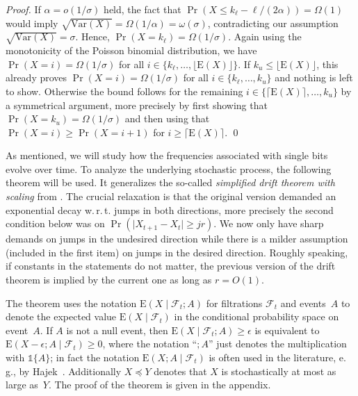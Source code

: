 \documentclass[11pt, a4paper]{article}
\DeclareMathOperator{\Prob}{Pr}
\newcommand*{\E}{\mathrm{E}}
\newcommand*{\Var}{\mathrm{Var}}
\newcommand{\wrt}{w.\,r.\,t.\xspace}
\newcommand{\eg}{e.\,g.\xspace}
\newcommand{\indic}[1]{\mathds{1}\{#1\}}
\newcommand{\filtt}{\mathcal{F}_t}
\begin{document}
\begin{proof}
If $\alpha=o(1/\sigma)$ held, the fact that $\Prob(X\le k_\ell-\ell/(2\alpha))=\Omega(1)$ 
would imply $\sqrt{\Var(X)}=\Omega(1/\alpha)=\omega(\sigma)$, 
contradicting our assumption $\sqrt{\Var(X)}=\sigma$. Hence, 
$\Prob(X=k_\ell)=\Omega(1/\sigma)$. Again using the monotonicity of 
the Poisson binomial distribution, we have
$\Prob(X=i)=\Omega(1/\sigma)$ for all $i\in\{k_\ell,\dots,\lfloor\E(X)\rfloor\}$. 
If $k_u\le \lfloor\E(X)\rfloor$, this already proves 
$\Prob(X=i)=\Omega(1/\sigma)$ for all $i\in\{k_\ell,\dots,k_u\}$ and nothing 
is left to show. Otherwise 
the bound follows for the remaining $i\in\{\lceil \E(X)\rceil,\dots,k_u\}$ 
by a symmetrical argument, more precisely by first showing that 
$\Prob(X=k_u)=\Omega(1/\sigma)$ and then 
using that $\Prob(X=i)\ge \Prob(X=i+1)$ for $i\ge \lceil \E(X)\rceil$.  
%
\qed\end{proof}



As mentioned, we will study how the frequencies associated with single bits evolve over time. 
To analyze the underlying stochastic process, the following theorem will be used. It generalizes 
the so-called \emph{simplified drift theorem with scaling} from \cite{OlivetoWittTCS15}. The crucial 
relaxation is that the original version demanded an exponential decay \wrt jumps in both 
directions, more precisely the second condition below was on $\Prob(\lvert X_{t+1}-X_{t}\rvert\ge jr)$. 
 We now only have sharp demands on jumps in the undesired direction while 
there is a milder assumption (included in the first item) on jumps in the desired direction. Roughly 
speaking, if constants in the statements do not matter, the previous version of the drift theorem 
is implied by the current one 
as long as $r=O(1)$. 

The theorem uses the notation $\E(X\mid \filtt;A)$ for filtrations $\filtt$ and events~$A$ to denote 
the expected value $\E(X\mid \filtt)$ in the conditional probability space on event~$A$. If $A$ is not a null event, 
then $\E(X\mid \filtt;A)\ge \epsilon$ is equivalent to $\E(X-\epsilon;A\mid \filtt)\ge 0$, where the 
notation ``$;A$'' just denotes the multiplication with $\indic{A}$; in fact 
the notation $\E(X;A\mid \filtt)$ is often used in the literature, \eg, by Hajek~\cite{Hajek1982}. 
Additionally $X\preceq Y$ denotes that $X$ is stochastically at most as large as~$Y$.
The proof of 
the theorem is given in the appendix.
\end{document}
